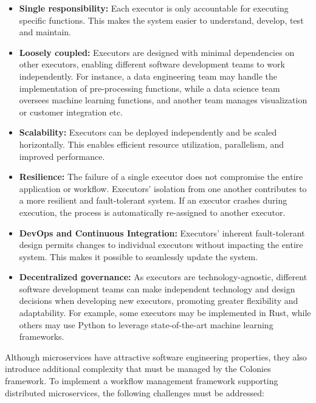 \documentclass{article}
\begin{document}
\begin{itemize}
\item \textbf{Single responsibility:} Each executor is only accountable for executing specific functions. This makes the system easier to understand, develop, test and maintain.  
\item \textbf{Loosely coupled:} Executors are designed with minimal dependencies on other executors, enabling different software development teams to work independently. For instance, a data engineering team may handle the implementation of pre-processing functions, while a data science team oversees machine learning functions, and another team manages visualization or customer integration etc.

\item \textbf{Scalability:} Executors can be deployed independently and be scaled horizontally. This enables efficient resource utilization, parallelism, and improved performance. 

\item \textbf{Resilience:} The failure of a single executor does not compromise the entire application or workflow. Executors' isolation from one another contributes to a more resilient and fault-tolerant system. If an executor crashes during execution, the process is automatically re-assigned to another executor.

\item \textbf{DevOps and Continuous Integration:} Executors' inherent fault-tolerant design permits changes to individual executors without impacting the entire system. This makes it possible to seamlessly update the system. 

\item \textbf{Decentralized governance:} As executors are technology-agnostic, different software development teams can make independent technology and design decisions when developing new executors, promoting greater flexibility and adaptability. For example, some executors may be implemented in Rust, while others may use Python to leverage state-of-the-art machine learning frameworks.
\end{itemize}

Although microservices have attractive software engineering properties, they also introduce additional complexity that must be managed by the Colonies framework. To implement a workflow management framework supporting distributed microservices, the following challenges must be addressed:
\end{document}
